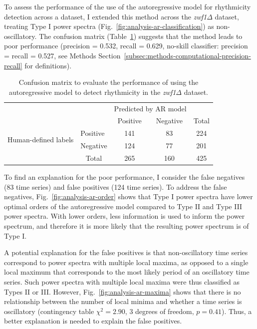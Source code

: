 To assess the performance of the use of the autoregressive model for rhythmicity detection across a dataset, I extended this method across the \textit{zwf1$\Delta$} dataset, treating Type I power spectra (Fig.\ \ref{fig:analysis-ar-classification}) as non-oscillatory.
The confusion matrix (Table~\ref{tab:analysis-ar-confusion-matrix}) suggests that the method leads to poor performance (precision = 0.532, recall = 0.629, no-skill classifier: precision = recall = 0.527, see Methods Section~\ref{subsec:methods-computational-precision-recall} for definitions).

\begin{table}[h!]
  \centering
  \begin{tabular}{l|l|c|c|c}
    \multicolumn{2}{c}{}&\multicolumn{2}{c}{Predicted by AR model}&\\
    \cline{3-4}
    \multicolumn{2}{c|}{}&Positive&Negative&\multicolumn{1}{c}{Total}\\
    \cline{2-4}
    \multirow{2}{*}{Human-defined labels}& Positive & 141 & 83 & 224\\
    \cline{2-4}
    & Negative & 124 & 77 & 201\\
    \cline{2-4}
    \multicolumn{1}{c}{} & \multicolumn{1}{c}{Total} & \multicolumn{1}{c}{265} & \multicolumn{1}{c}{160} & \multicolumn{1}{c}{425}\\
  \end{tabular}
  \caption[
    Confusion matrix to evaluate the performance of using the autoregressive model \parencite{jiaFrequencyDomainAnalysis2020} to detect rhythmicity.
  ]{
    Confusion matrix to evaluate the performance of using the autoregressive model \parencite{jiaFrequencyDomainAnalysis2020} to detect rhythmicity in the \textit{zwf1$\Delta$} dataset.
  }
  \label{tab:analysis-ar-confusion-matrix}
\end{table}

To find an explanation for the poor performance, I consider the false negatives (83 time series) and false positives (124 time series).
To address the false negatives, Fig.\ \ref{fig:analysis-ar-order} shows that Type I power spectra have lower optimal orders of the autoregressive model compared to Type II and Type III power spectra.
With lower orders, less information is used to inform the power spectrum, and therefore it is more likely that the resulting power spectrum is of Type I.

A potential explanation for the false positives is that non-oscillatory time series correspond to power spectra with multiple local maxima, as opposed to a single local maximum that corresponds to the most likely period of an oscillatory time series.
Such power spectra with multiple local maxima were thus classified as Types II or III\@.
However, Fig.\ \ref{fig:analysis-ar-maxima} shows that there is no relationship between the number of local minima and whether a time series is oscillatory (contingency table $\chi^{2} = 2.90$, 3 degrees of freedom, $p = 0.41$).
Thus, a better explanation is needed to explain the false positives.

